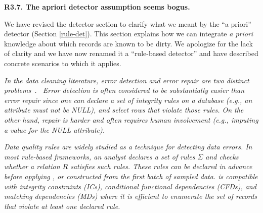 \vspace{0.5em}

\noindent\textbf{R3.7. The apriori detector assumption seems bogus.} 

\noindent  We have revised the detector section to clarify what we meant by the ``a priori'' detector (Section \ref{rule-det}). This section explains how we can integrate \emph{a priori} knowledge about which records are known to be dirty. We apologize for the lack of clarity and we have now renamed it a ``rule-based detector'' and have described concrete scenarios to which it applies. 

\vspace{0.5em}

\emph{In the data cleaning literature, error detection and error repair are two distinct problems~\cite{DBLP:series/synthesis/2012Fan, Dasu:2003:EDM:861869, rahm2000data}.
 Error detection is often considered to be substantially easier than error repair since one can declare a set of integrity rules on a database (e.g., an attribute must not be NULL), and select rows that violate those rules.
On the other hand, repair is harder and often requires human involvement (e.g., imputing a value for the NULL attribute).}

\vspace{0.5em}

\emph{Data quality rules are widely studied as a technique for detecting data errors.
In most rule-based frameworks, an analyst declares a set of rules $\Sigma$ and checks whether a relation $R$ satisfies such rules.
These rules can be declared in advance before applying \sys, or constructed from the first batch of sampled data.
\sys is compatible with integrity constraints (ICs), conditional functional dependencies (CFDs), and matching dependencies (MDs) where it is efficient to enumerate the set of records that violate at least one declared rule. }